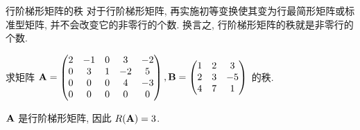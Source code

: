 \begin{frame}{行阶梯形矩阵的秩}
	\onslide<+->
	对于行阶梯形矩阵, 再实施初等变换使其变为行最简形矩阵或标准型矩阵, 并不会改变它的非零行的个数.
	\onslide<+->
	换言之, \alert{行阶梯形矩阵的秩就是非零行的个数}.

	\onslide<+->
	\begin{example}
		求矩阵 ${\mathbf{A}}=\begin{pmatrix}
			2&-1&0&3&-2\\
			0&3&1&-2&5\\
			0&0&0&4&-3\\
			0&0&0&0&0
		\end{pmatrix},{\mathbf{B}}=\begin{pmatrix}
			1&2&3\\
			2&3&-5\\
			4&7&1
		\end{pmatrix}$ 的秩.
	\end{example}
	\onslide<+->
	\begin{solution}
		${\mathbf{A}}$ 是行阶梯形矩阵, 因此 $R({\mathbf{A}})=3$.
		\onslide<+->{\[\bfB\wsim{r_2-2r_1}{r_4-4r_1}\begin{pmatrix}
			1&2&3\\
			0&-1&-11\\
			0&-1&-11
		\end{pmatrix}\wsim{r_3-r_2}{-r_2}\begin{pmatrix}
			1&2&3\\
			0&1&11\\
			0&0&0
		\end{pmatrix}\visible<+->{\implies R(\bfB)=2.}\]}
		\vspace{-\baselineskip}
	\end{solution}
\end{frame}


